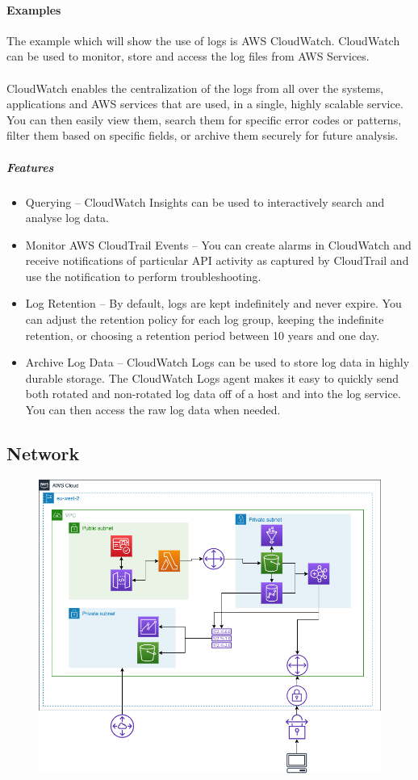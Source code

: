 \documentclass[10pt]{article}
\begin{document}
\paragraph{Examples}
The example which will show the use of logs is AWS CloudWatch. CloudWatch can be used to monitor, store and access the log files from AWS Services.
\\ \\
CloudWatch enables the centralization of the logs from all over the systems, applications and AWS services that are used, in a single, highly scalable service. You can then easily view them, search them for specific error codes or patterns, filter them based on specific fields, or archive them securely for future analysis. \cite{aws-cloudwatch}
\subparagraph{Features}
\begin{itemize}
	\item Querying – CloudWatch Insights can be used to interactively search and analyse log data. 
	\item Monitor AWS CloudTrail Events – You can create alarms in CloudWatch and receive notifications of particular API activity as captured by CloudTrail and use the notification to perform troubleshooting.
	\item Log Retention – By default, logs are kept indefinitely and never expire. You can adjust the retention policy for each log group, keeping the indefinite retention, or choosing a retention period between 10 years and one day.
	\item Archive Log Data – CloudWatch Logs can be used to store log data in highly durable storage. The CloudWatch Logs agent makes it easy to quickly send both rotated and non-rotated log data off of a host and into the log service. You can then access the raw log data when needed.
\end{itemize}

\newpage
\subsection{Network}
\label{sec:network}
\begin{figure}[h!]
	\centering
	\includegraphics[width=0.62\linewidth]{images/Network.png}
\end{figure}
\end{document}
